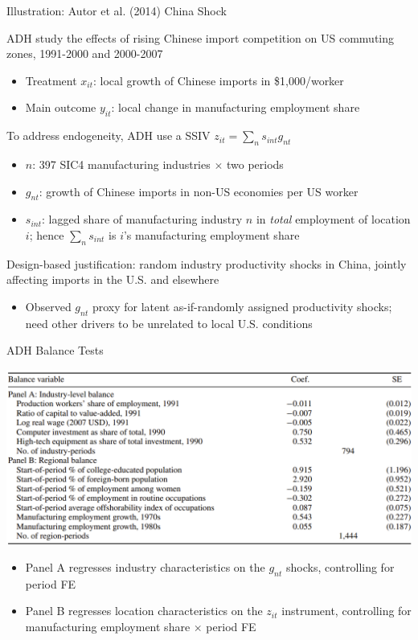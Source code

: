\documentclass[11pt,english]{beamer}
\begin{document}
\begin{frame}{Illustration: Autor et al. (2014) China Shock}

\vspace{0.2cm}
ADH study the effects of rising Chinese import competition on US commuting zones, 1991-2000 and 2000-2007\smallskip
\begin{itemize}
\item Treatment $x_{i t}$: local growth of Chinese imports in \$1,000/worker \smallskip
\item Main outcome $y_{i t}$: local change in manufacturing employment share
\end{itemize}\bigskip\pause{}

To address endogeneity, ADH use a SSIV $z_{i t}=\sum_n s_{i n t} g_{n t}$ \smallskip
\begin{itemize}
\item $n$: 397 SIC4 manufacturing industries $\times$ two periods\smallskip
\item $g_{nt}$: growth of Chinese imports in non-US economies per US worker\smallskip
\item $s_{i n t}$: lagged share of manufacturing industry $n$ in \emph{total} employment of location $i$; hence $\sum_{n}s_{i n t}$ is $i$'s manufacturing employment share
\end{itemize}\bigskip\pause{}

Design-based justification: random industry productivity shocks in China, jointly affecting imports in the U.S. and elsewhere\smallskip
\begin{itemize}
\item Observed $g_{nt}$ proxy for latent as-if-randomly assigned productivity shocks; need other drivers to be unrelated to local U.S. conditions
\end{itemize}
\end{frame}

\begin{frame}{ADH Balance Tests}
\begin{center}
	\includegraphics[width=1\textwidth]{figures/adh_balance.png}
\end{center}
\begin{itemize}
\item Panel A regresses industry characteristics on the $g_{nt}$ shocks, controlling for period FE\smallskip
\item Panel B regresses location characteristics on the $z_{it}$ instrument, controlling for manufacturing employment share $\times$ period FE
\end{itemize}
\end{frame}
\end{document}
